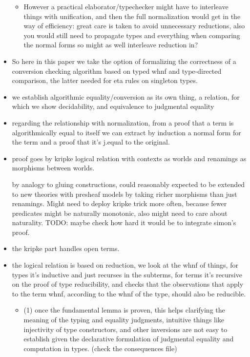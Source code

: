 \documentclass{book}
\begin{document}
\begin{itemize}
\begin{itemize}
   \item However a practical elaborator/typechecker might have to
   interleave things with unification, and then the full normalization
   would get in the way of efficiency: great care is taken to avoid
   unnecessary reductions, also you would still need to propagate
   types and everything when comparing the normal forms so might as
   well interleave reduction in?
   \end{itemize}

 \item So here in this paper we take the option of formalizing the
 correctness of a conversion checking algorithm based on typed whnf and
 type-directed comparison, the latter needed for eta rules on singleton types.

 \item we establish algorithmic equality/conversion as its own thing, a
 relation, for which we show decidability, and equivalence to
 judgmental equality

 \item regarding the relationship with normalization, from a proof that a
 term is algorithmically equal to itself we can extract by induction a
 normal form for the term and a proof that it's j.equal to the
 original.

 \item proof goes by kripke logical relation with contexts as worlds and renamings as morphisms between worlds.

   by analogy to gluing constructions, could reasonably expected to
   be extended to new theories with presheaf models by taking richer
   morphisms than just renamings.
   Might need to deploy kripke trick more often, because fewer
   predicates might be naturally monotonic, also might need to care
   about naturality.
   TODO: maybe check how hard it would be to integrate simon's proof.

 \item the kripke part handles open terms.

 \item the logical relation is based on reduction, we look at the whnf of
 things, for types it's inductive and just recurses in the subterms,
 for terms it's recursive on the proof of type reducibility, and checks that
 the observations that apply to the term whnf, according to the whnf of
 the type, should also be reducible.
   \begin{itemize}
   \item (1) once the fundamental lemma is proven, this helps clarifying
     the meaning of the typing and equality
     judgments, intuitive things like injectivity of type constructors,
     and other inversions are not easy to establish given
     the declarative formulation of judgmental equality
     and computation in types. (check the consequences file)


\end{itemize}
\end{itemize}
\end{document}
